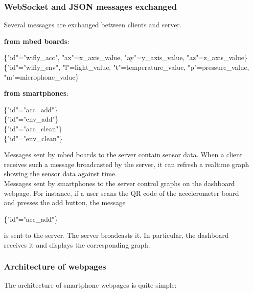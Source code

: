 \documentclass[pdftex,10pt,a4paper]{report}
\newenvironment{packed_item}{
\begin{itemize}
  \setlength{\itemsep}{1pt}
  \setlength{\parskip}{0pt}
  \setlength{\parsep}{0pt}
}{\end{itemize}}
\begin{document}
\subsubsection{WebSocket and JSON messages exchanged}
Several messages are exchanged between clients and server. 
\begin{packed_item}
	\item \textbf{from mbed boards}: 
		\begin{center}
				\{"id"="wifly\_acc", "ax"=x\_axis\_value, "ay"=y\_axis\_value, "az"=z\_axis\_value\} \\
				\{"id"="wifly\_env", "l"=light\_value, "t"=temperature\_value, "p"=pressure\_value, "m"=microphone\_value\}
		\end{center}
	\item \textbf{from smartphones}:
		\begin{center}
				\{"id"="acc\_add"\} \\
				\{"id"="env\_add"\} \\
				\{"id"="acc\_clean"\} \\
				\{"id"="env\_clean"\}
		\end{center}
		
\end{packed_item}

Messages sent by mbed boards to the server contain sensor data. When a client receives such a message broadcasted by the server, it can refresh a realtime graph showing the sensor data against time. \\

Messages sent by smartphones to the server control graphs on the dashboard webpage. For instance, if a user scans the QR code of the accelerometer board and presses the add button, the message 
		\begin{center}
				\{"id"="acc\_add"\}
		\end{center}
is sent to the server. The server broadcasts it. In particular, the dashboard receives it and displays the corresponding graph. \\

\subsubsection{Architecture of webpages}
The architecture of smartphone webpages is quite simple:
\end{document}
